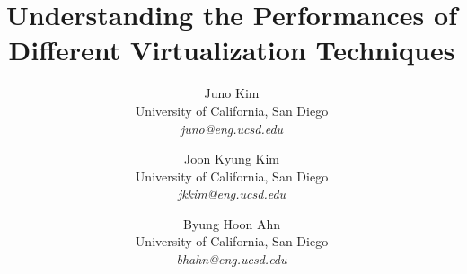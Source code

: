 \documentclass[letterpaper,twocolumn,10pt]{article}
\begin{document}

\title{\bf Understanding the Performances of Different Virtualization Techniques}
\author{
  {\rm Juno Kim}\\
  University of California, San Diego\\
  \textit{juno@eng.ucsd.edu}
  \and
  {\rm Joon Kyung Kim}\\
  University of California, San Diego\\
  \textit{jkkim@eng.ucsd.edu}
  \and
  {\rm Byung Hoon Ahn}\\
  University of California, San Diego\\
  \textit{bhahn@eng.ucsd.edu}
} %

\maketitle






% 



% 
% 

{\normalsize 
}

\end{document}
